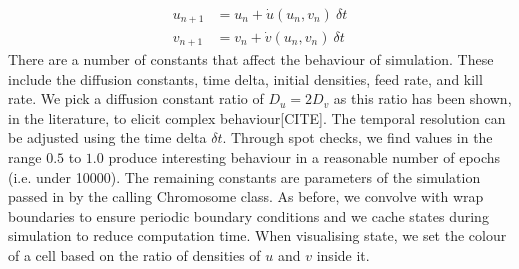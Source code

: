 \begin{align*}
    u_{n+1} &= u_n + \dot{u}(u_n, v_n)\ \delta t\\
    v_{n+1} &= v_n + \dot{v}(u_n, v_n)\ \delta t
\end{align*}
There are a number of constants that affect the behaviour of simulation. These include the diffusion constants, time delta, initial densities, feed rate, and kill rate. We pick a diffusion constant ratio of $D_u = 2D_v$ as this ratio has been shown, in the literature, to elicit complex behaviour[CITE]. The temporal resolution can be adjusted using the time delta $\delta t$. Through spot checks, we find values in the range $0.5$ to $1.0$ produce interesting behaviour in a reasonable number of epochs (i.e. under 10000). The remaining constants are parameters of the simulation passed in by the calling Chromosome class. As before, we convolve with wrap boundaries to ensure periodic boundary conditions and we cache states during simulation to reduce computation time. When visualising state, we set the colour of a cell based on the ratio of densities of $u$ and $v$ inside it.\\

